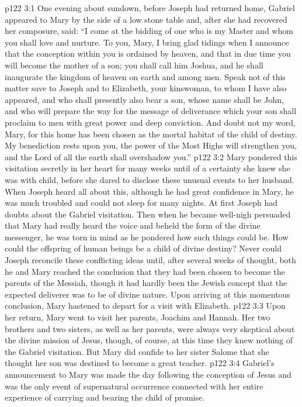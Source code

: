 \vs p122 3:1 One evening about sundown, before Joseph had returned home, Gabriel appeared to Mary by the side of a low stone table and, after she had recovered her composure, said: “I come at the bidding of one who is my Master and whom you shall love and nurture. To you, Mary, I bring glad tidings when I announce that the conception within you is ordained by heaven, and that in due time you will become the mother of a son; you shall call him Joshua, and he shall inaugurate the kingdom of heaven on earth and among men. Speak not of this matter save to Joseph and to Elizabeth, your kinswoman, to whom I have also appeared, and who shall presently also bear a son, whose name shall be John, and who will prepare the way for the message of deliverance which your son shall proclaim to men with great power and deep conviction. And doubt not my word, Mary, for this home has been chosen as the mortal habitat of the child of destiny. My benediction rests upon you, the power of the Most Highs will strengthen you, and the Lord of all the earth shall overshadow you.”
\pc \vs p122 3:2 Mary pondered this visitation secretly in her heart for many weeks until of a certainty she knew she was with child, before she dared to disclose these unusual events to her husband. When Joseph heard all about this, although he had great confidence in Mary, he was much troubled and could not sleep for many nights. At first Joseph had doubts about the Gabriel visitation. Then when he became well\hyp{}nigh persuaded that Mary had really heard the voice and beheld the form of the divine messenger, he was torn in mind as he pondered how such things could be. How could the offspring of human beings be a child of divine destiny? Never could Joseph reconcile these conflicting ideas until, after several weeks of thought, both he and Mary reached the conclusion that they had been chosen to become the parents of the Messiah, though it had hardly been the Jewish concept that the expected deliverer was to be of divine nature. Upon arriving at this momentous conclusion, Mary hastened to depart for a visit with Elizabeth.
\vs p122 3:3 Upon her return, Mary went to visit her parents, Joachim and Hannah. Her two brothers and two sisters, as well as her parents, were always very skeptical about the divine mission of Jesus, though, of course, at this time they knew nothing of the Gabriel visitation. But Mary did confide to her sister Salome that she thought her son was destined to become a great teacher.
\pc \vs p122 3:4 Gabriel’s announcement to Mary was made the day following the conception of Jesus and was the only event of supernatural occurrence connected with her entire experience of carrying and bearing the child of promise.
